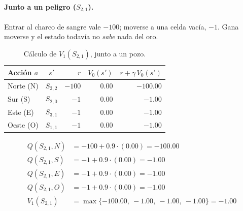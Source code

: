 \documentclass[11pt,letterpaper]{article}
\begin{document}
\paragraph{Junto a un peligro ($S_{2,1}$).} Entrar al charco de sangre vale $-100$; moverse a una celda vacía, $-1$. Gana moverse y el estado todavía no \emph{sabe} nada del oro.
\begin{table}[H]
\centering
\small
\caption{Cálculo de $V_1(S_{2,1})$, junto a un pozo.}
\label{tab:it1-peligro}
\begin{tabular}{lcrrr}
\toprule
Acción $a$ & $s'$ & $r$ & $V_{0}(s')$ & $r + \gamma\,V_{0}(s')$ \\
\midrule
Norte (N) & $S_{2,2}$ & $-100$ & $0.00$ & $-100.00$ \\
Sur (S) & $S_{2,0}$ & $-1$ & $0.00$ & $\mathbf{-1.00}$ \\
Este (E) & $S_{3,1}$ & $-1$ & $0.00$ & $\mathbf{-1.00}$ \\
Oeste (O) & $S_{1,1}$ & $-1$ & $0.00$ & $\mathbf{-1.00}$ \\
\bottomrule
\end{tabular}
\end{table}
\begin{align*}
Q(S_{2,1},N) &= -100 + 0.9\cdot(0.00) = -100.00 \\
Q(S_{2,1},S) &= -1 + 0.9\cdot(0.00) = -1.00 \\
Q(S_{2,1},E) &= -1 + 0.9\cdot(0.00) = -1.00 \\
Q(S_{2,1},O) &= -1 + 0.9\cdot(0.00) = -1.00 \\
V_{1}(S_{2,1}) &= \max\{-100.00,\ -1.00,\ -1.00,\ -1.00\} = \mathbf{-1.00}
\end{align*}
\end{document}
